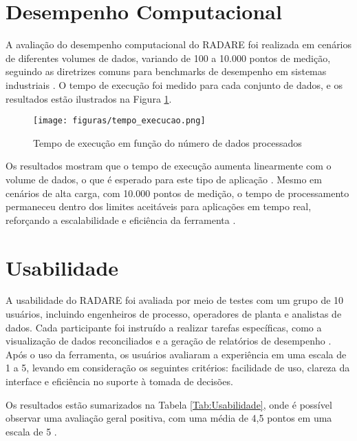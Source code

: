\section{Desempenho Computacional}
\label{Sec:DesempenhoComputacional}

A avaliação do desempenho computacional do RADARE foi realizada em cenários de diferentes volumes de dados, variando de 100 a 10.000 pontos de medição, seguindo as diretrizes comuns para benchmarks de desempenho em sistemas industriais \cite{benchmarkIndustrialSystems}. O tempo de execução foi medido para cada conjunto de dados, e os resultados estão ilustrados na Figura \ref{Fig:TempoExecucao}.

\begin{figure}[htbp]
    \centering
    \texttt{[image: figuras/tempo\_execucao.png]}
    \caption{Tempo de execução em função do número de dados processados}
    \label{Fig:TempoExecucao}
\end{figure}

Os resultados mostram que o tempo de execução aumenta linearmente com o volume de dados, o que é esperado para este tipo de aplicação \cite{scalableDataProcessing}. Mesmo em cenários de alta carga, com 10.000 pontos de medição, o tempo de processamento permaneceu dentro dos limites aceitáveis para aplicações em tempo real, reforçando a escalabilidade e eficiência da ferramenta \cite{realTimeIndustryTools}.

\section{Usabilidade}
\label{Sec:Usabilidade}

A usabilidade do RADARE foi avaliada por meio de testes com um grupo de 10 usuários, incluindo engenheiros de processo, operadores de planta e analistas de dados. Cada participante foi instruído a realizar tarefas específicas, como a visualização de dados reconciliados e a geração de relatórios de desempenho \cite{usabilityStudiesIndustry}. Após o uso da ferramenta, os usuários avaliaram a experiência em uma escala de 1 a 5, levando em consideração os seguintes critérios: facilidade de uso, clareza da interface e eficiência no suporte à tomada de decisões.

Os resultados estão sumarizados na Tabela \ref{Tab:Usabilidade}, onde é possível observar uma avaliação geral positiva, com uma média de 4,5 pontos em uma escala de 5 \cite{usabilityMetrics}.

